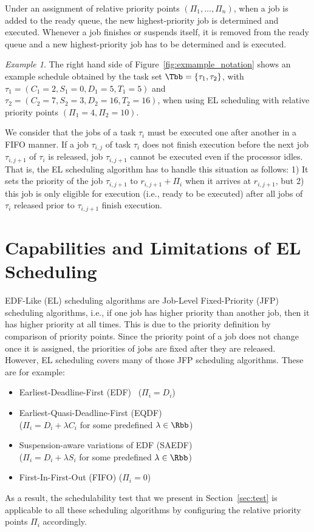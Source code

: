 \documentclass[conference]{IEEEtran}
\theoremstyle{definition}
\theoremstyle{remark}
\newtheorem{exmpl}[thm]{Example}
\begin{document}
Under an assignment of relative priority points $(\Pi_1, \dots, \Pi_n)$, when a job is added to the ready queue, the new highest-priority job is determined and executed.
Whenever a job finishes or suspends itself, it is removed from the ready queue and a new highest-priority job has to be determined and is executed.

\begin{exmpl}
	The right hand side of Figure~\ref{fig:exmample_notation} shows an example schedule obtained by the task set $\Tbb=\{\tau_1,\tau_2\}$, with $\tau_1=(C_1=2, S_1=0, D_1=5, T_1=5)$ and $\tau_2=(C_2=7, S_2=3, D_2=16, T_2=16)$, when using EL scheduling with relative priority points $(\Pi_1=4,\Pi_2=10)$.
\end{exmpl}


We consider that the jobs of a task $\tau_i$ must be executed one
after another in a FIFO manner. If a job $\tau_{i,j}$ of task
$\tau_i$ does not finish execution before the next job
$\tau_{i,j+1}$ of $\tau_i$ is released, job $\tau_{i,j+1}$
cannot be executed even if the processor idles. That is, the
EL scheduling algorithm has to handle this situation as
follows: 1) It sets the priority of the job $\tau_{i,j+1}$ to
$r_{i,j+1} + \Pi_i$ when it arrives at $r_{i,j+1}$, but 2) this
job is only eligible for execution (i.e., ready to be executed) after
all jobs of $\tau_i$ released prior to $\tau_{i,j+1}$ finish execution.


\section{Capabilities and Limitations of EL Scheduling}
\label{sec:capabilities_and_limitations}

EDF-Like (EL) scheduling algorithms are Job-Level Fixed-Priority (JFP) scheduling algorithms, i.e., if one job has higher priority than another job, then it has higher priority at all times.
This is due to the priority definition by comparison of priority points.
Since the priority point of a job does not change once it is assigned, the priorities of jobs are fixed after they are released.
%
However, EL scheduling covers many of those JFP scheduling algorithms.
These are for example: 
\begin{itemize}
	\item Earliest-Deadline-First (EDF)~\cite{liu73scheduling} ($\Pi_i = D_i$)
	\item Earliest-Quasi-Deadline-First (EQDF)~\cite{DBLP:conf/rtas/BackCS12} \\($\Pi_i = D_i + \lambda C_i$ for some predefined $\lambda \in \Rbb$) 
	\item Suspension-aware variations of EDF (SAEDF)\\($\Pi_i = D_i + \lambda S_i$ for some predefined $\lambda \in \Rbb$) 
	\item First-In-First-Out (FIFO) ($\Pi_i = 0$)
\end{itemize}
As a result, the schedulability test that we present in Section~\ref{sec:test} is applicable to all these scheduling algorithms by configuring the relative priority points $\Pi_i$ accordingly.
\end{document}
